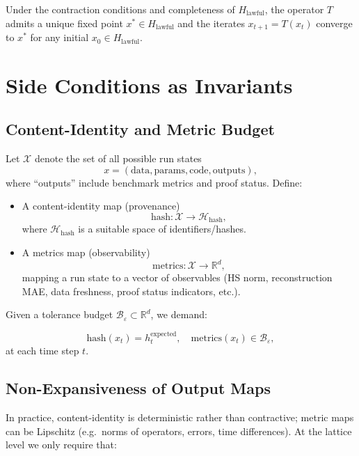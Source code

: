 \documentclass[11pt]{article}
\begin{document}
\begin{corollary}
Under the contraction conditions and completeness of $H_{\mathrm{lawful}}$, the operator $T$ admits a unique fixed point $x^*\in H_{\mathrm{lawful}}$ and the iterates $x_{t+1}=T(x_t)$ converge to $x^*$ for any initial $x_0\in H_{\mathrm{lawful}}$.
\end{corollary}

\section{Side Conditions as Invariants}

\subsection{Content-Identity and Metric Budget}

Let $\mathcal{X}$ denote the set of all possible run states
\[
x = (\text{data},\text{params},\text{code},\text{outputs}),
\]
where ``outputs'' include benchmark metrics and proof status. Define:

\begin{itemize}
  \item A content-identity map (provenance)
    \[
      \mathrm{hash}:\mathcal{X}\to \mathcal{H}_{\mathrm{hash}},
    \]
    where $\mathcal{H}_{\mathrm{hash}}$ is a suitable space of identifiers/hashes.
  \item A metrics map (observability)
    \[
      \mathrm{metrics}:\mathcal{X}\to \mathbb{R}^d,
    \]
    mapping a run state to a vector of observables (HS norm, reconstruction MAE, data freshness, proof status indicators, etc.).
\end{itemize}

Given a tolerance budget $\mathcal{B}_\varepsilon \subset \mathbb{R}^d$, we demand:

\begin{equation}
  \mathrm{hash}(x_t) = h_t^{\mathrm{expected}},
  \quad
  \mathrm{metrics}(x_t)\in \mathcal{B}_\varepsilon,
  \label{eq:side-conditions}
\end{equation}
at each time step $t$.

\subsection{Non-Expansiveness of Output Maps}

In practice, content-identity is deterministic rather than contractive; metric maps can be Lipschitz (e.g.\ norms of operators, errors, time differences). At the lattice level we only require that:
\end{document}
